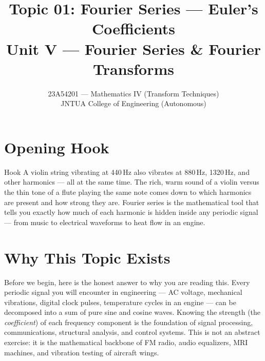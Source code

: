 \documentclass[12pt,a4paper]{article}
\title{Topic 01: Fourier Series --- Euler's Coefficients \\ \large Unit V --- Fourier Series \& Fourier Transforms}
\author{23A54201 --- Mathematics IV (Transform Techniques) \\ JNTUA College of Engineering (Autonomous)}
\date{}
\begin{document}
\maketitle
\tableofcontents
\newpage

\section{Opening Hook}

\begin{curiositybox}{Hook}
A violin string vibrating at 440\,Hz also vibrates at 880\,Hz, 1320\,Hz, and other harmonics --- all at the same time.
The rich, warm sound of a violin versus the thin tone of a flute playing the same note comes down to which harmonics are present and how strong they are.
Fourier series is the mathematical tool that tells you exactly how much of each harmonic is hidden inside any periodic signal --- from music to electrical waveforms to heat flow in an engine.
\end{curiositybox}

\section{Why This Topic Exists}

Before we begin, here is the honest answer to why you are reading this.
Every periodic signal you will encounter in engineering --- AC voltage, mechanical vibrations, digital clock pulses, temperature cycles in an engine --- can be decomposed into a sum of pure sine and cosine waves.
Knowing the strength (the \emph{coefficient}) of each frequency component is the foundation of signal processing, communications, structural analysis, and control systems.
This is not an abstract exercise: it is the mathematical backbone of FM radio, audio equalizers, MRI machines, and vibration testing of aircraft wings.

\bigskip
\end{document}
